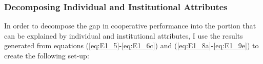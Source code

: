 \documentclass[11pt]{article}
\begin{document}
\subsubsection{Decomposing Individual and Institutional Attributes} \label{sec:E1_dec}

In order to decompose the gap in cooperative performance into the portion that can be explained by individual and institutional attributes, I use the results generated from equations (\ref{eq:E1_5}-\ref{eq:E1_6c}) and (\ref{eq:E1_8a}-\ref{eq:E1_9e}) to create the following set-up: \\

        \begin{table}[H]
        \caption{Individual vs. Institutional Decomposition (Cross-Sectional)}
        \label{table:E1_1}
        \centering
        \end{table}   
        
\end{document}
